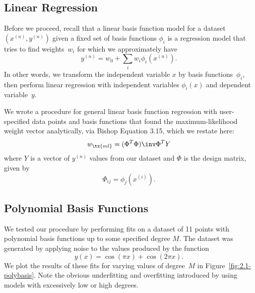 \documentclass{article}
\begin{document}
\begin{multicols}{2}

\section{Linear Regression}

Before we proceed, recall that a linear basis function model for a dataset $(x^{(n)},y^{(n)})$ given a fixed set of basis functions $\phi_i$ is a regression model that tries to find weights~$w_i$ for which we approximately have
\[ y^{(n)} = w_0 + \sum_i w_i \phi_i(x^{(n)}). \]
In other words, we transform the independent variable $x$ by basis functions~$\phi_i$, then perform linear regression with independent variables $\phi_i(x)$ and dependent variable~$y$.

We wrote a procedure for general linear basis function regression with user-specified data points and basis functions that found the maximum-likelihood weight vector analytically, via Bishop Equation 3.15, which we restate here:
\begin{equation}
\label{eq:max-likelihood-weights}
w_\tx{ml} = (\Phi^T\Phi)\inv\Phi^T Y
\end{equation}
where $Y$ is a vector of $y^{(n)}$ values from our dataset and $\Phi$ is the design matrix, given by
\begin{equation}
\Phi_{ij} = \phi_j(x^{(i)}).
\end{equation}

\subsection{Polynomial Basis Functions}

We tested our procedure by performing fits on a dataset of 11 points with polynomial basis functions up to some specified degree $M$. The dataset was generated by applying noise to the values produced by the function
\begin{equation}
\label{eq:dataset-secret-func}
y(x) = \cos(\pi x) + \cos(2\pi x).
\end{equation}
We plot the results of these fits for varying values of degree~$M$ in Figure~\ref{fig:2.1-polybasis}. Note the obvious underfitting and overfitting introduced by using models with excessively low or high degrees.


\end{multicols}
\end{document}
